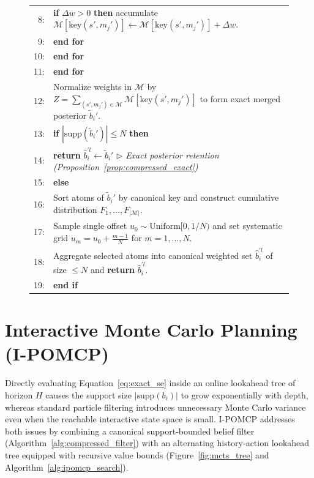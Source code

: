 \begin{figure}[t]
{\begin{minipage}{0.97\textwidth}
\begin{tabular}{@{}r@{\hspace{6pt}}p{}@{}}
        8: & \hspace{3.6em} \textbf{if} $\Delta w > 0$ \textbf{then} accumulate $\mathcal{M}[\mathrm{key}(s', m_j')] \leftarrow \mathcal{M}[\mathrm{key}(s', m_j')] + \Delta w$. \\
        9: & \hspace{2.4em} \textbf{end for} \\
        10: & \hspace{1.2em} \textbf{end for} \\
        11: & \textbf{end for} \\
        12: & Normalize weights in $\mathcal{M}$ by $Z = \sum_{(s', m_j') \in \mathcal{M}} \mathcal{M}[\mathrm{key}(s', m_j')]$ to form exact merged posterior $\tilde{b}_i'$. \\
        13: & \textbf{if} $|\mathrm{supp}(\tilde{b}_i')| \le N$ \textbf{then} \\
        14: & \hspace{1.2em} \textbf{return} $\hat{b}_i^{\prime l} \leftarrow \tilde{b}_i'$ \hfill $\triangleright$ \textit{Exact posterior retention (Proposition~\ref{prop:compressed_exact})} \\
        15: & \textbf{else} \\
        16: & \hspace{1.2em} Sort atoms of $\tilde{b}_i'$ by canonical key and construct cumulative distribution $F_1, \dots, F_{|\mathcal{M}|}$. \\
        17: & \hspace{1.2em} Sample single offset $u_0 \sim \mathrm{Uniform}[0, 1/N)$ and set systematic grid $u_m = u_0 + \frac{m-1}{N}$ for $m = 1, \dots, N$. \\
        18: & \hspace{1.2em} Aggregate selected atoms into canonical weighted set $\hat{b}_i^{\prime l}$ of size $\le N$ and \textbf{return} $\hat{b}_i^{\prime l}$. \\
        19: & \textbf{end if}
      \end{tabular}
      \vspace{3pt}
    \end{minipage}%
  }
\end{figure}

\section{Interactive Monte Carlo Planning (I-POMCP)}
\label{sec:method}

Directly evaluating Equation~\eqref{eq:exact_se} inside an online lookahead tree of horizon $H$ causes the support size $|\mathrm{supp}(b_i)|$ to grow exponentially with depth, whereas standard particle filtering \citep{doshi2009monte} introduces unnecessary Monte Carlo variance even when the reachable interactive state space is small. I-POMCP addresses both issues by combining a canonical support-bounded belief filter (Algorithm~\ref{alg:compressed_filter}) with an alternating history-action lookahead tree equipped with recursive value bounds (Figure~\ref{fig:mcts_tree} and Algorithm~\ref{alg:ipomcp_search}).

